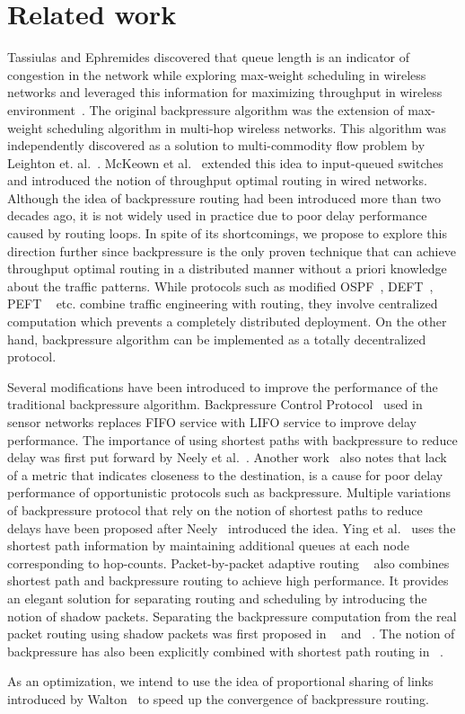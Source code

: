 \label{sec:related}
\section*{Related work}

Tassiulas and Ephremides discovered that queue length is an indicator of congestion in the network while exploring max-weight scheduling in wireless networks and leveraged this information for maximizing throughput in wireless environment~\cite{BP-orig}. The original backpressure algorithm was the extension of max-weight scheduling algorithm in multi-hop wireless networks. This algorithm was independently discovered as a solution to multi-commodity flow problem by Leighton et. al.~\cite{Leighton1}. McKeown et al.~\cite{nick1} extended this idea to input-queued switches and introduced the notion of throughput optimal routing in wired networks. Although the idea of backpressure routing had been introduced more than two decades ago, it is not widely used in practice due to poor delay performance caused by routing loops. In spite of its shortcomings, we propose to explore this direction further since backpressure is the only proven technique that can achieve throughput optimal routing in a distributed manner without a priori knowledge about the traffic patterns. While protocols such as modified OSPF~\cite{mOSPF}, DEFT~\cite{DEFT}, PEFT ~\cite{PEFT} etc. combine traffic engineering with routing, they involve centralized computation which prevents a completely distributed deployment. On the other hand, backpressure algorithm can be implemented as a totally decentralized protocol.

Several modifications have been introduced to improve the performance of the traditional backpressure algorithm. Backpressure Control Protocol~\cite{BCP} used in sensor networks replaces FIFO service with LIFO service to improve delay performance. The importance of using shortest paths with backpressure to reduce delay was first put forward by Neely et al.~\cite{Neely1}. Another work~\cite{SP1} also notes that lack of a metric that indicates closeness to the destination, is a cause for poor delay performance of opportunistic protocols such as backpressure. Multiple variations of backpressure protocol that rely on the notion of shortest paths to reduce delays have been proposed after Neely~\cite{Neely1} introduced the idea. Ying et al.~\cite{Austin1} uses the shortest path information by maintaining additional queues at each node corresponding to hop-counts. Packet-by-packet adaptive routing ~\cite{Srikant3} also combines shortest path and backpressure routing to achieve high performance. It provides an elegant solution for separating routing and scheduling by introducing the notion of shadow packets. Separating the backpressure computation from the real packet routing using shadow packets was first proposed in ~\cite{Srikant1} and ~\cite{Srikant2}. The notion of backpressure has also been explicitly combined with shortest path routing in ~\cite{BP-lcn}.

As an optimization, we intend to use the idea of proportional sharing of links introduced by Walton~\cite{walton} to speed up the convergence of backpressure routing.
